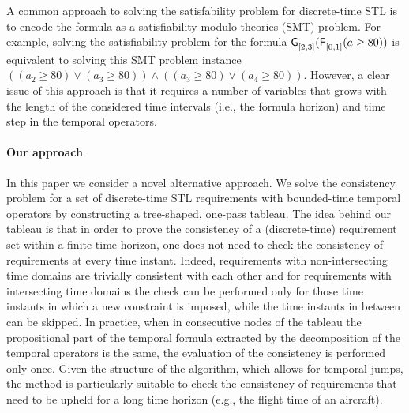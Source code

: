 \documentclass[acmsmall,screen]{acmart}
\begin{document}
A common approach to solving the satisfability problem for discrete-time STL is to encode the formula as a satisfiability modulo theories (SMT) problem.
For example, solving the satisfiability problem for the formula $\mathop{\mathsf{\mathsf{G}}^{{}}_{[2,3]}}(\mathop{\mathsf{\mathsf{F}}^{{}}_{[0,1]}}(a \geq 80))$ is equivalent to solving this SMT problem instance
$((a_2 \geq 80) \vee (a_3 \geq 80)) \wedge ((a_3 \geq 80) \vee (a_4 \geq 80))$.
However, a clear issue of this approach is that it requires a number of variables that grows with the length of the considered time intervals (i.e., the formula horizon) and time step in the temporal operators.

\paragraph{Our approach} In this paper we consider a novel alternative approach.  We solve the consistency problem for a set of discrete-time STL requirements with bounded-time temporal operators by constructing a tree-shaped, one-pass tableau. The idea behind our tableau is that in order to prove the consistency of a (discrete-time) requirement set within a finite time horizon, one does not need to check the consistency of requirements at every time instant. Indeed, requirements with non-intersecting time domains are trivially consistent with each other and for requirements with intersecting time domains the check can be performed only for those time instants in which a new constraint is imposed, while the time instants in between can be skipped. In practice, when in consecutive nodes of the tableau the propositional part of the temporal formula extracted by the decomposition of the temporal operators is the same, the evaluation of the consistency is performed only once.
Given the structure of the algorithm, which allows for temporal jumps, the method is particularly suitable to check the consistency of requirements that need to be upheld for a long time horizon (e.g., the flight time of an aircraft).
\end{document}
